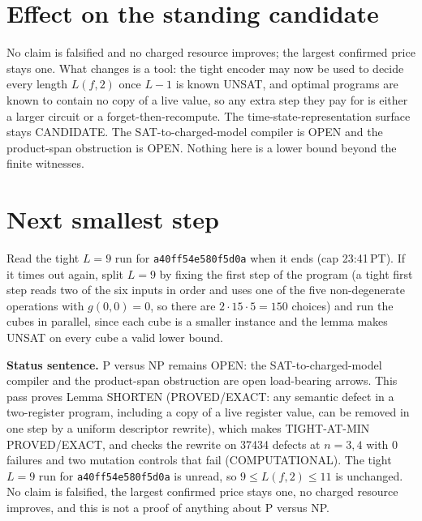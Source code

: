 \documentclass[11pt]{article}
\begin{document}
\section*{Effect on the standing candidate}
No claim is falsified and no charged resource improves; the largest confirmed price stays one. What changes is a tool: the tight encoder may now be used to decide every length $L(f,2)$ once $L-1$ is known UNSAT, and optimal programs are known to contain no copy of a live value, so any extra step they pay for is either a larger circuit or a forget-then-recompute. The time-state-representation surface stays CANDIDATE. The SAT-to-charged-model compiler is OPEN and the product-span obstruction is OPEN. Nothing here is a lower bound beyond the finite witnesses.

\section*{Next smallest step}
Read the tight $L=9$ run for \texttt{a40ff54e580f5d0a} when it ends (cap 23:41\,PT). If it times out again, split $L=9$ by fixing the first step of the program (a tight first step reads two of the six inputs in order and uses one of the five non-degenerate operations with $g(0,0)=0$, so there are $2\cdot 15\cdot 5=150$ choices) and run the cubes in parallel, since each cube is a smaller instance and the lemma makes UNSAT on every cube a valid lower bound.

\bigskip
\noindent\textbf{Status sentence.} P versus NP remains OPEN: the SAT-to-charged-model compiler and the product-span obstruction are open load-bearing arrows. This pass proves Lemma SHORTEN (PROVED/EXACT: any semantic defect in a two-register program, including a copy of a live register value, can be removed in one step by a uniform descriptor rewrite), which makes TIGHT-AT-MIN PROVED/EXACT, and checks the rewrite on 37434 defects at $n=3,4$ with 0 failures and two mutation controls that fail (COMPUTATIONAL). The tight $L=9$ run for \texttt{a40ff54e580f5d0a} is unread, so $9\le L(f,2)\le 11$ is unchanged. No claim is falsified, the largest confirmed price stays one, no charged resource improves, and this is not a proof of anything about P versus NP.
\end{document}
